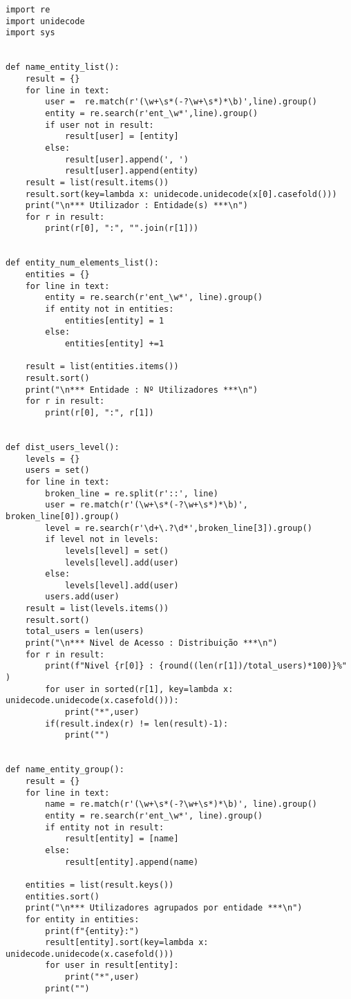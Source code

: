 \documentclass[11pt,a4paper]{report}%
\begin{document}
\begin{verbatim}
import re
import unidecode
import sys


def name_entity_list():
    result = {}
    for line in text:
        user =  re.match(r'(\w+\s*(-?\w+\s*)*\b)',line).group()
        entity = re.search(r'ent_\w*',line).group()
        if user not in result:
            result[user] = [entity]
        else:
            result[user].append(', ')
            result[user].append(entity)
    result = list(result.items())
    result.sort(key=lambda x: unidecode.unidecode(x[0].casefold()))
    print("\n*** Utilizador : Entidade(s) ***\n")
    for r in result:
        print(r[0], ":", "".join(r[1]))


def entity_num_elements_list():
    entities = {}
    for line in text:
        entity = re.search(r'ent_\w*', line).group()
        if entity not in entities:
            entities[entity] = 1
        else:
            entities[entity] +=1

    result = list(entities.items())
    result.sort()
    print("\n*** Entidade : Nº Utilizadores ***\n")
    for r in result:
        print(r[0], ":", r[1])


def dist_users_level():
    levels = {}
    users = set()
    for line in text:
        broken_line = re.split(r'::', line)
        user = re.match(r'(\w+\s*(-?\w+\s*)*\b)', broken_line[0]).group()
        level = re.search(r'\d+\.?\d*',broken_line[3]).group()
        if level not in levels:
            levels[level] = set()
            levels[level].add(user)
        else:
            levels[level].add(user)
        users.add(user)
    result = list(levels.items())
    result.sort()
    total_users = len(users)
    print("\n*** Nivel de Acesso : Distribuição ***\n")
    for r in result:
        print(f"Nivel {r[0]} : {round((len(r[1])/total_users)*100)}%" )
        for user in sorted(r[1], key=lambda x: unidecode.unidecode(x.casefold())):
            print("*",user)
        if(result.index(r) != len(result)-1):
            print("")


def name_entity_group():
    result = {}
    for line in text:
        name = re.match(r'(\w+\s*(-?\w+\s*)*\b)', line).group()
        entity = re.search(r'ent_\w*', line).group()
        if entity not in result:
            result[entity] = [name]
        else:
            result[entity].append(name)

    entities = list(result.keys())
    entities.sort()
    print("\n*** Utilizadores agrupados por entidade ***\n")
    for entity in entities:
        print(f"{entity}:")
        result[entity].sort(key=lambda x: unidecode.unidecode(x.casefold()))
        for user in result[entity]:
            print("*",user)
        print("")



\end{verbatim}
\end{document}
